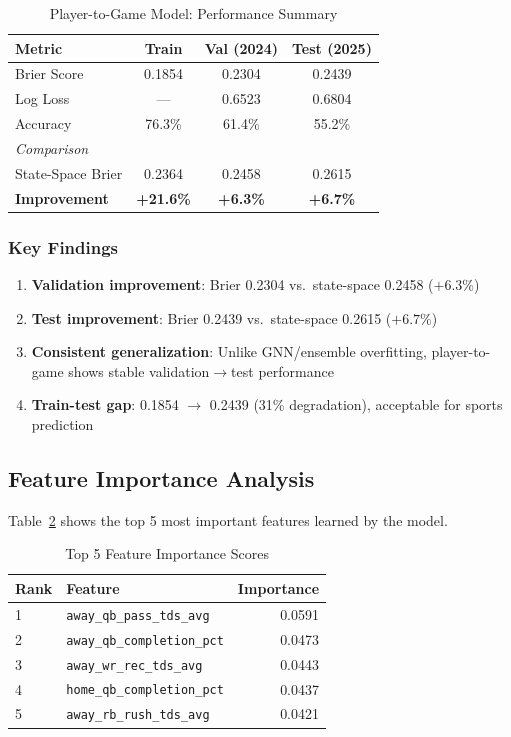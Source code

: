 \begin{table}[htbp]
\centering
\caption{Player-to-Game Model: Performance Summary}
\label{tab:player-to-game-results}
\begin{tabular}{lccc}
\toprule
\textbf{Metric} & \textbf{Train} & \textbf{Val (2024)} & \textbf{Test (2025)} \\
\midrule
Brier Score & 0.1854 & 0.2304 & 0.2439 \\
Log Loss & --- & 0.6523 & 0.6804 \\
Accuracy & 76.3\% & 61.4\% & 55.2\% \\
\midrule
\textit{Comparison} & & & \\
State-Space Brier & 0.2364 & 0.2458 & 0.2615 \\
\textbf{Improvement} & \textbf{+21.6\%} & \textbf{+6.3\%} & \textbf{+6.7\%} \\
\bottomrule
\end{tabular}
\end{table}

\subsubsection{Key Findings}

\begin{enumerate}
    \item \textbf{Validation improvement}: Brier 0.2304 vs.\ state-space 0.2458 ($+6.3\%$)
    \item \textbf{Test improvement}: Brier 0.2439 vs.\ state-space 0.2615 ($+6.7\%$)
    \item \textbf{Consistent generalization}: Unlike GNN/ensemble overfitting, player-to-game shows stable validation$\to$test performance
    \item \textbf{Train-test gap}: 0.1854 $\to$ 0.2439 (31\% degradation), acceptable for sports prediction
\end{enumerate}

\subsection{Feature Importance Analysis}

Table~\ref{tab:feature-importance} shows the top 5 most important features learned by the model.

\begin{table}[htbp]
\centering
\caption{Top 5 Feature Importance Scores}
\label{tab:feature-importance}
\begin{tabular}{llr}
\toprule
\textbf{Rank} & \textbf{Feature} & \textbf{Importance} \\
\midrule
1 & \texttt{away\_qb\_pass\_tds\_avg} & 0.0591 \\
2 & \texttt{away\_qb\_completion\_pct} & 0.0473 \\
3 & \texttt{away\_wr\_rec\_tds\_avg} & 0.0443 \\
4 & \texttt{home\_qb\_completion\_pct} & 0.0437 \\
5 & \texttt{away\_rb\_rush\_tds\_avg} & 0.0421 \\
\bottomrule
\end{tabular}
\end{table}

